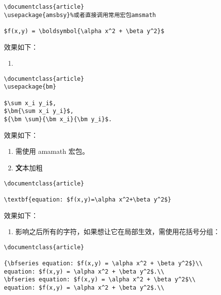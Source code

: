 \begin{verbatim}
\documentclass{article}
\usepackage{amsbsy}%或者直接调用常用宏包amsmath

$f(x,y) = \boldsymbol{\alpha x^2 + \beta y^2}$

\end{verbatim}

效果如下：

\begin{enumerate}
\def\labelenumi{\arabic{enumi}.}
\setcounter{enumi}{3}
\item
\end{enumerate}

\begin{verbatim}
\documentclass{article}
\usepackage{bm}

$\sum x_i y_i$,
$\bm{\sum x_i y_i}$,
${\bm \sum}{\bm x_i}{\bm y_i}$.

\end{verbatim}

效果如下：

\begin{enumerate}
\def\labelenumi{\arabic{enumi}.}
\setcounter{enumi}{4}
\item

  需使用 amamath 宏包。
\item
  \textbf
  文本加粗
\end{enumerate}

\begin{verbatim}
\documentclass{article}

\textbf{equation: $f(x,y)=\alpha x^2+\beta y^2$}

\end{verbatim}

效果如下：

\begin{enumerate}
\def\labelenumi{\arabic{enumi}.}
\setcounter{enumi}{6}

\item
   影响之后所有的字符，如果想让它在局部生效，需使用花括号分组：
\end{enumerate}

\begin{verbatim}
\documentclass{article}

{\bfseries equation: $f(x,y) = \alpha x^2 + \beta y^2$}\\
equation: $f(x,y) = \alpha x^2 + \beta y^2$.\\
\bfseries equation: $f(x,y) = \alpha x^2 + \beta y^2$\\
equation: $f(x,y) = \alpha x^2 + \beta y^2$.\\

\end{verbatim}

